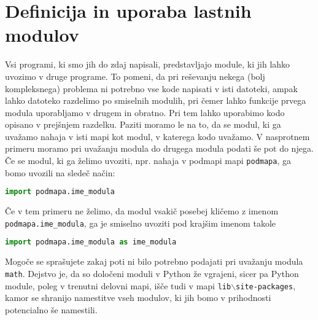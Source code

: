 \section{Definicija in uporaba lastnih modulov}
Vsi programi, ki smo jih do zdaj napisali, predstavljajo module, ki jih lahko uvozimo v druge programe. To pomeni, da pri reševanju nekega (bolj kompleksnega) problema ni potrebno vse kode napisati v isti datoteki, ampak lahko datoteko razdelimo po smiselnih modulih, pri čemer lahko funkcije prvega modula uporabljamo v drugem in obratno. Pri tem lahko uporabimo kodo opisano v prejšnjem razdelku. Paziti moramo le na to, da se modul, ki ga uvažamo nahaja v isti mapi kot modul, v katerega kodo uvažamo. V nasprotnem primeru moramo pri uvažanju modula do drugega modula podati še pot do njega. Če se modul, ki ga želimo uvoziti, npr. nahaja v podmapi mapi \texttt{podmapa}, ga bomo uvozili na sledeč način:
\begin{lstlisting}[language=Python, showstringspaces=false]
import podmapa.ime_modula
\end{lstlisting}
Če v tem primeru ne želimo, da modul vsakič posebej kličemo z imenom \texttt{podmapa.ime\_modula}, ga je smiselno uvoziti pod krajšim imenom takole
\begin{lstlisting}[language=Python, showstringspaces=false]
import podmapa.ime_modula as ime_modula
\end{lstlisting}
Mogoče se sprašujete zakaj poti ni bilo potrebno podajati pri uvažanju modula \texttt{math}. Dejstvo je, da so določeni moduli v Python že vgrajeni, sicer pa Python module, poleg v trenutni delovni mapi, išče tudi v mapi \texttt{lib$\backslash$site-packages}, kamor se shranijo namestitve vseh modulov, ki jih bomo v prihodnosti potencialno še namestili.

